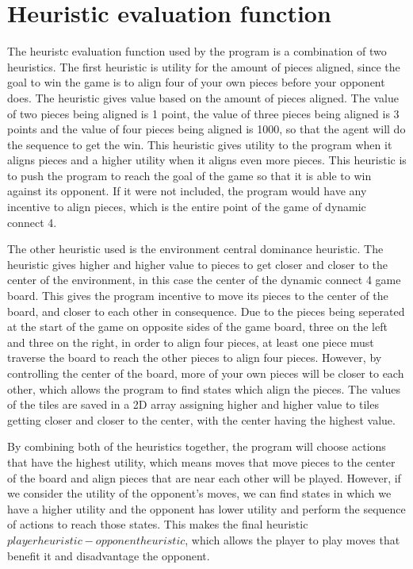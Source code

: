 \documentclass[11pt]{article}
\begin{document}
\section{Heuristic evaluation function}
The heuristc evaluation function used by the program is a combination of two heuristics. The first heuristic is utility for the amount of pieces aligned, since the goal to win the game is to align four of your own pieces before your opponent does. The heuristic gives value based on the amount of pieces aligned. The value of two pieces being aligned is 1 point, the value of three pieces being aligned is 3 points and the value of four pieces being aligned is 1000, so that the agent will do the sequence to get the win. This heuristic gives utility to the program when it aligns pieces and a higher utility when it aligns even more pieces. This heuristic is to push the program to reach the goal of the game so that it is able to win against its opponent. If it were not included, the program would have any incentive to align pieces, which is the entire point of the game of dynamic connect 4.

The other heuristic used is the environment central dominance heuristic. The heuristic gives higher and higher value to pieces to get closer and closer to the center of the 
environment, in this case the center of the dynamic connect 4 game board. This gives the program incentive to move its pieces to the center of the board, and closer to each other in consequence. Due to the pieces being seperated at the start of the game on opposite sides of the game board, three on the left and three on the right, in order to align four pieces, at least one piece must traverse the board to reach the other pieces to align four pieces. However, by controlling the center of the board, more of your own pieces will be closer to each other, which allows the program to find states which align the pieces. The values of the tiles are saved in a 2D array assigning higher and higher value to tiles getting closer and closer to the center, with the center having the highest value.

By combining both of the heuristics together, the program will choose actions that have the highest utility, which means moves that move pieces to the center of the board and align pieces that are near each other will be played. However, if we consider the utility of the opponent's moves, we can find states in which we have a higher utility and the opponent has lower utility and perform the sequence of actions to reach those states. This makes the final heuristic $ player heuristic - opponent heuristic $, which allows the player to play moves that benefit it and disadvantage the opponent. 
\end{document}
